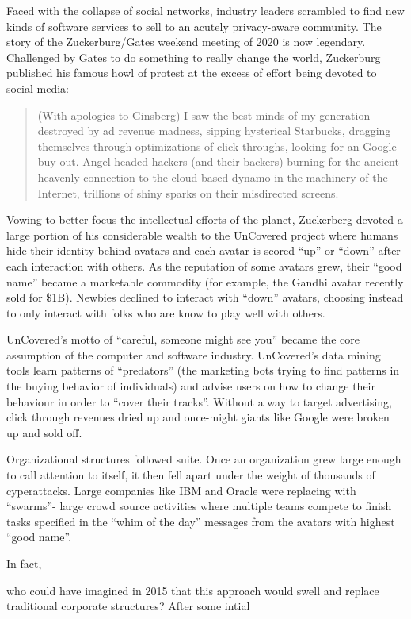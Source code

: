 \documentclass[journal]{IEEEtran}
\begin{document}
\begin{itemize}
{Faced with the collapse of social networks, industry leaders scrambled
to find new kinds of software services to sell to an acutely privacy-aware
community.
The story of the Zuckerburg/Gates weekend meeting of 2020 is now legendary.
Challenged by Gates to do something to really change the world, Zuckerburg published his famous howl of protest at the excess of effort being devoted to
social media:
\begin{quote}
(With apologies to Ginsberg) I saw the best minds of my generation destroyed by ad revenue madness, sipping hysterical Starbucks, dragging themselves through optimizations of click-throughs, looking for an Google buy-out. Angel-headed hackers (and their backers) burning for the ancient heavenly connection to the cloud-based dynamo in the machinery of the Internet, trillions of shiny sparks on their misdirected screens.
\end{quote}
Vowing to better focus the intellectual efforts of the planet, 
Zuckerberg devoted a large portion of his considerable wealth to the UnCovered
project where humans hide their identity  behind avatars and each avatar is
scored ``up'' or ``down'' after each interaction with others. As the reputation of some avatars grew, their ``good name'' became a marketable  commodity (for example, the Gandhi avatar recently sold for \$1B). Newbies declined to interact with ``down'' avatars, choosing instead to only interact with folks who are know to play well with others. 

UnCovered's motto of ``careful, someone might see you'' became the core assumption of the computer and software industry. UnCovered's  data mining tools  learn  patterns of ``predators'' (the marketing bots trying to find  patterns in the buying behavior of individuals) and advise users on how to change
their behaviour in order to  ``cover their tracks''.
Without a way to target advertising, click through revenues dried up and once-might giants like Google were broken up and sold off. 


Organizational structures followed suite. Once an organization grew large enough to call attention to itself, it then fell apart under the weight of thousands of cyperattacks. Large companies
like  IBM and Oracle were replacing with ``swarms''-
large crowd source activities where multiple teams compete to finish tasks specified in the ``whim of the day'' messages from   the avatars
with highest ``good name''.

In fact, 

who could have imagined in 2015 that this approach would swell and replace traditional corporate structures? After some intial 



}
\end{itemize}
\end{document}

